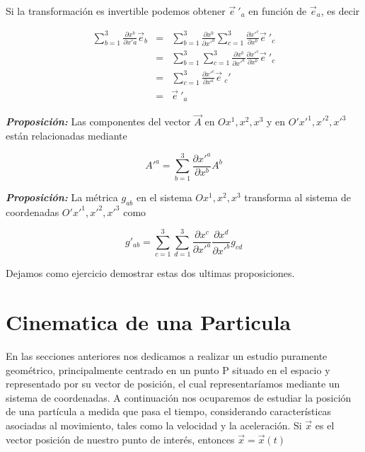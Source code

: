 \documentclass[12pt]{report}
\begin{document}
Si la transformación es invertible podemos obtener $\vec{e}\ '_a$ en función de $\vec{e}_a$, es decir

\begin{eqnarray} \nonumber
\sum_{b=1}^3 \frac{\partial x^b}{\partial x'a} \vec{e}_b&=&\sum_{b=1}^3 \frac{\partial x^b}{\partial x'^a} \sum_{c=1}^3 \frac{\partial x'^c}{\partial x^b} \vec{e}\ '_c \\ \nonumber
&=&\sum_{b=1}^3 \sum_{c=1}^3\frac{\partial x^b}{\partial x'^a}  \frac{\partial x'^c}{\partial x^b} \vec{e}\ '_c \\ \nonumber
&=&\sum_{c=1}^3 \frac{\partial x'^c}{\partial x^a} \vec{e}\ _c ' \\ \nonumber
&=& \vec{e}\ '_a
\end{eqnarray}

\textbf{\textit{Proposición:}} Las componentes del vector $\vec{A}$ en $O x^1,x^2,x^3$ y en $O'x'^1,x'^2,x'^3$ están relacionadas mediante


\begin{equation} \label{2.90}
A'^a = \sum_{b=1}^3 \frac{\partial x'^a}{\partial x^b}A^b
\end{equation}


\textbf{\textit{Proposición:}} La métrica $g_{ab}$ en el sistema $O x^1,x^2,x^3$ transforma al sistema de coordenadas $O'x'^1,x'^2,x'^3$ como

\begin{equation} \label{2.91}
g'_{ab}= \sum_{c=1}^3 \sum_{d=1}^3 \frac{\partial x^c}{\partial x'^a}\frac{\partial x^d}{\partial x'^b} g_{cd}
\end{equation}


Dejamos como ejercicio demostrar estas dos ultimas proposiciones. 

\section{Cinematica de una Particula }


En las secciones anteriores nos dedicamos a realizar un estudio puramente geométrico, principalmente centrado en un punto P situado en el espacio y representado por su vector de posición, el cual representaríamos mediante un sistema de coordenadas. A continuación nos ocuparemos de estudiar la posición de una partícula a medida que pasa el tiempo, considerando características asociadas al movimiento, tales como la velocidad y la aceleración. Si $\vec{x}$ es el vector posición de nuestro punto de interés, entonces $\vec{x}=\vec{x}(t)$
\end{document}
